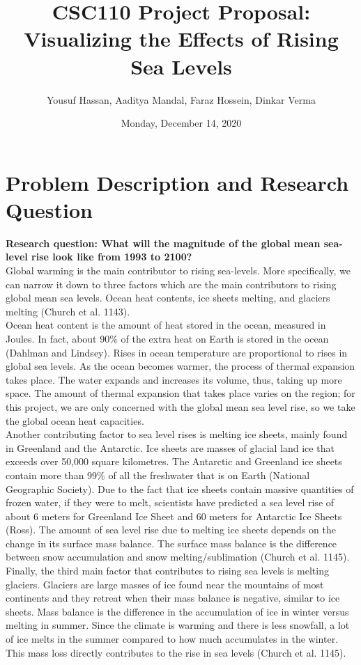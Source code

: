 \documentclass[fontsize=11pt]{article}
\title{CSC110 Project Proposal: Visualizing the Effects of Rising Sea Levels}
\author{Yousuf Hassan, Aaditya Mandal, Faraz Hossein, Dinkar Verma}
\date{Monday, December 14, 2020}
\begin{document}
\maketitle

\section*{Problem Description and Research Question}

\textbf{Research question: What will the magnitude of the global mean sea-level rise look like from 1993 to 2100?} \\

Global warming is the main contributor to rising sea-levels. More specifically, we can narrow it down to three factors which are the main contributors to rising global mean sea levels. Ocean heat contents, ice sheets melting, and glaciers melting (Church et al. 1143).\\

Ocean heat content is the amount of heat stored in the ocean, measured in Joules. In fact, about 90\% of the extra heat on Earth is stored in the ocean (Dahlman and Lindsey). Rises in ocean temperature are proportional to rises in global sea levels. As the ocean becomes warmer, the process of thermal expansion takes place. The water expands and increases its volume, thus, taking up more space. The amount of thermal expansion that takes place varies on the region; for this project, we are only concerned with the global mean sea level rise, so we take the global ocean heat capacities.\\

Another contributing factor to sea level rises is melting ice sheets, mainly found in Greenland and the Antarctic. Ice sheets are masses of glacial land ice that exceeds over 50,000 square kilometres. The Antarctic and Greenland ice sheets contain more than 99\% of all the freshwater that is on Earth (National Geographic Society). Due to the fact that ice sheets contain massive quantities of frozen water, if they were to melt, scientists have predicted a sea level rise of about 6 meters for Greenland Ice Sheet and 60 meters for Antarctic Ice Sheets (Ross). The amount of sea level rise due to melting ice sheets depends on the change in its surface mass balance. The surface mass balance is the difference between snow accumulation and snow melting/sublimation (Church et al. 1145).\\

Finally, the third main factor that contributes to rising sea levels is melting glaciers. Glaciers are large masses of ice found near the mountains of most continents and they retreat when their mass balance is negative, similar to ice sheets. Mass balance is the difference in the accumulation of ice in winter versus melting in summer. Since the climate is warming and there is less snowfall, a lot of ice melts in the summer compared to how much accumulates in the winter. This mass loss directly contributes to the rise in sea levels (Church et al. 1145).\\
\end{document}
